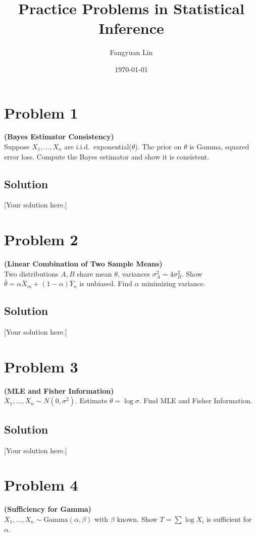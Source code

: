 \documentclass[12pt]{article}
\title{Practice Problems in Statistical Inference}
\author{Fangyuan Lin}
\date{\today}
\begin{document}
\maketitle


\section*{Problem 1}
\textbf{(Bayes Estimator Consistency)} \\
Suppose $X_1,\dots,X_n$ are i.i.d.\ exponential($\theta$). The prior on $\theta$ is Gamma, squared error loss. Compute the Bayes estimator and show it is consistent.

\subsection*{Solution}
[Your solution here.]

\newpage
\section*{Problem 2}
\textbf{(Linear Combination of Two Sample Means)} \\
Two distributions $A,B$ share mean $\theta$, variances $\sigma_A^2=4\sigma_B^2$. Show $\hat{\theta}=\alpha \bar{X}_m + (1-\alpha)\bar{Y}_n$ is unbiased. Find $\alpha$ minimizing variance.

\subsection*{Solution}
[Your solution here.]

\newpage
\section*{Problem 3}
\textbf{(MLE and Fisher Information)} \\
$X_1,\dots,X_n \sim N(0,\sigma^2)$. Estimate $\theta=\log\sigma$. Find MLE and Fisher Information.

\subsection*{Solution}
[Your solution here.]

\newpage
\section*{Problem 4}
\textbf{(Sufficiency for Gamma)} \\
$X_1,\dots,X_n \sim \text{Gamma}(\alpha,\beta)$ with $\beta$ known. Show $T=\sum \log X_i$ is sufficient for $\alpha$.
\end{document}
